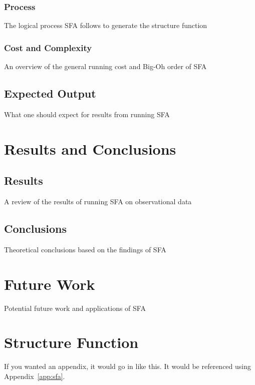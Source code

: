 \documentclass[12pt, oneside]{smuthesis}
\begin{document}
\subsection{\sc Process}

The logical process SFA follows to generate the structure function

\subsection{\sc Cost and Complexity} \label{costComplexity}

An overview of the general running cost and Big-Oh order of SFA

\section{\sc Expected Output} \label{expectedOutput}

What one should expect for results from running SFA

\chapter{\sc Results and Conclusions} \label{resultsConclusions}

\section{\sc Results} \label{results}

A review of the results of running SFA on observational data

\section{\sc Conclusions} \label{conclusions}

Theoretical conclusions based on the findings of SFA

\chapter{\sc Future Work} \label{futureWork}

Potential future work and applications of SFA


\appendix

\chapter{Structure Function} \label{appendixSFA}
\label{app:sfa}
If you wanted an appendix, it would go in like this.  It would be 
referenced using Appendix~\ref{app:sfa}.


\begin{singlespace}

\end{singlespace}
\end{document}
